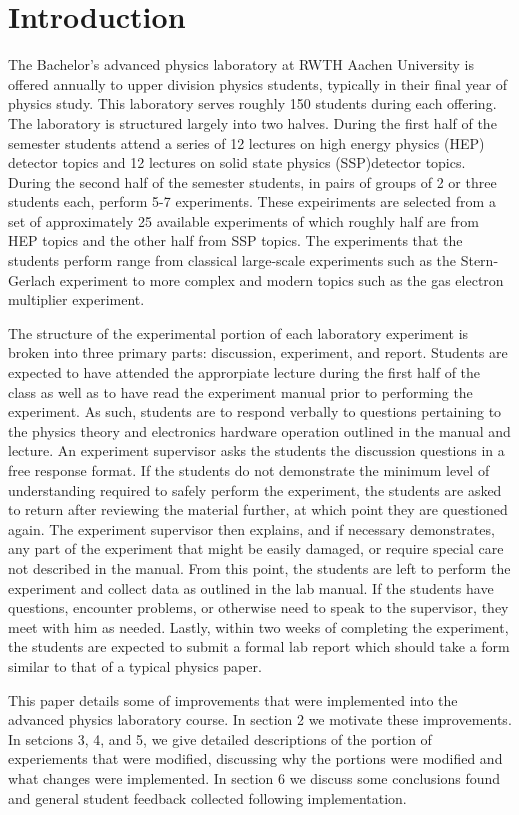 \section{Introduction}
The Bachelor's advanced physics laboratory at RWTH Aachen University is offered annually to upper division physics students, typically in their final year of physics study.
This laboratory serves roughly 150 students during each offering.
The laboratory is structured largely into two halves.
During the first half of the semester students attend a series of 12 lectures on high energy physics (HEP) detector topics and 12 lectures on solid state physics (SSP)detector topics.
During the second half of the semester students, in pairs of groups of 2 or three students each, perform 5-7 experiments.
These expeiriments are selected from a set of approximately 25 available experiments of which roughly half are from HEP topics and the other half from SSP topics.
The experiments that the students perform range from classical large-scale experiments such as the Stern-Gerlach experiment to more complex and modern topics such as the gas electron multiplier experiment.


The structure of the experimental portion of each laboratory experiment is broken into three primary parts: discussion, experiment, and report.
Students are expected to have attended the approrpiate lecture during the first half of the class as well as to have read the experiment manual prior to performing the experiment.
As such, students are to respond verbally to questions pertaining to the physics theory and electronics hardware operation outlined in the manual and lecture.
An experiment supervisor asks the students the discussion questions in a free response format.
If the students do not demonstrate the minimum level of understanding required to safely perform the experiment, the students are asked to return after reviewing the material further, at which point they are questioned again.
The experiment supervisor then explains, and if necessary demonstrates, any part of the experiment that might be easily damaged, or require special care not described in the manual.
From this point, the students are left to perform the experiment and collect data as outlined in the lab manual.
If the students have questions, encounter problems, or otherwise need to speak to the supervisor, they meet with him as needed.
Lastly, within two weeks of completing the experiment, the students are expected to submit a formal lab report which should take a form similar to that of a typical physics paper.

This paper details some of improvements that were implemented into the advanced physics laboratory course.
In section 2 we motivate these improvements.
In setcions 3, 4, and 5, we give detailed descriptions of the portion of experiements that were modified, discussing why the portions were modified and what changes were implemented.
In section 6 we discuss some conclusions found and general student feedback collected following implementation.
